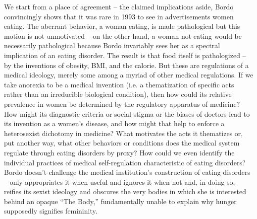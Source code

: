 \documentclass[11pt]{article}
\begin{document}
    We start from a place of agreement -- the claimed implications aside, Bordo convincingly shows that it was rare in 1993 to see in advertisements women eating. The aberrant behavior, a woman eating, is made pathological but this motion is not unmotivated -- on the other hand, a woman not eating would be necessarily pathological because Bordo invariably sees her as a spectral implication of an eating disorder. The result is that food itself is pathologized -- by the inventions of obesity, BMI, and the calorie. But these are regulations of a medical ideology, merely some among a myriad of other medical regulations. If we take anorexia to be a medical invention (i.e. a thematization of specific acts rather than an irreducible biological condition), then how could its relative prevalence in women be determined by the regulatory apparatus of medicine? How might its diagnostic criteria or social stigma or the biases of doctors lead to its invention as a women's disease, and how might that help to enforce a heterosexist dichotomy in medicine? What motivates the acts it thematizes or, put another way, what other behaviors or conditions does the medical system regulate through eating disorders by proxy? How could we even identify the individual practices of medical self-regulation characteristic of eating disorders? Bordo doesn't challenge the medical institution's construction of eating disorders -- only appropriates it when useful and ignores it when not and, in doing so, reifies its sexist ideology and obscures the very bodies in which she is interested behind an opaque ``The Body,'' fundamentally unable to explain why hunger supposedly signifies femininity.
\end{document}
